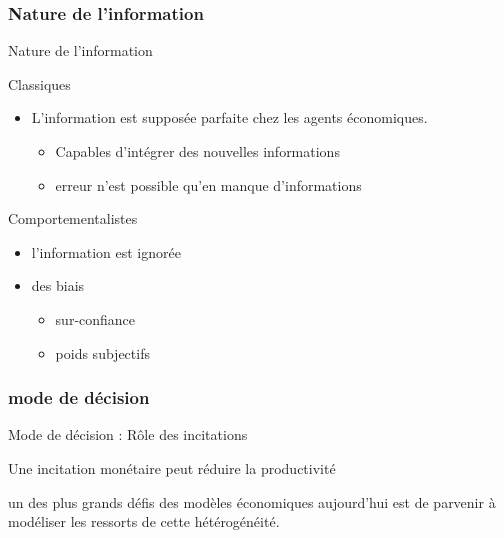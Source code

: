 \documentclass[serif]{beamer}
\begin{document}
\subsubsection{Nature de l'information}

\begin{frame}{Nature de l'information}
\begin{block}{Classiques}
\begin{itemize}
\item L'information est supposée parfaite chez les agents économiques.
	\begin{itemize}
	\item Capables d'intégrer des nouvelles informations
	\item erreur n'est possible qu'en manque d'informations
	\end{itemize}

\end{itemize}
\end{block}

\begin{block}{Comportementalistes}
 \begin{itemize}
 	\item l'information est ignorée 
 	\item des biais 
 		\begin{itemize}
 		\item[\ding{248}] sur-confiance
 		\item[\ding{248}] poids subjectifs
 		\end{itemize}
 \end{itemize}
\end{block}
\end{frame}
\subsubsection{mode de décision}

\begin{frame}{Mode de décision : Rôle des incitations}
\begin{alertblock}{}
Une incitation monétaire peut réduire la productivité
\end{alertblock}

\begin{exampleblock}{}
 un des plus grands défis des modèles économiques aujourd’hui est de parvenir à modéliser les ressorts de cette hétérogénéité. 
\end{exampleblock}
\end{frame}
\end{document}
